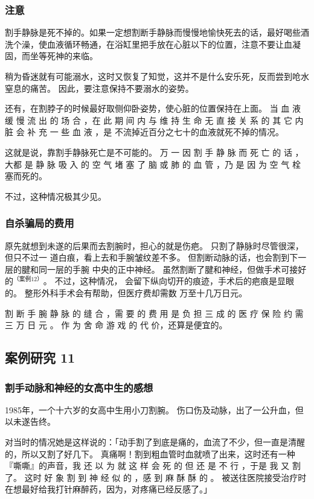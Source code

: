 \documentclass[UTF8]{ctexart}
\begin{document}
\subsubsection*{注意}

割手静脉是死不掉的。如果一定想割断手静脉而慢慢地愉快死去的话，最好喝些酒洗个澡，使血液循环畅通，在浴缸里把手放在心脏以下的位置，注意不要让血凝固，而坐等死神的来临。

稍为昏迷就有可能溺水，这时又恢复了知觉，这并不是什么安乐死，反而尝到呛水窒息的痛苦。
因此，要注意保持不要溺水的姿势。

还有，在割脖子的时候最好取侧仰卧姿势，使心脏的位置保持在上面。
当 血 液 缓 慢 流 出 的 场 合 ，在 此 期 间 内 与 维 持 生 命 无 直 接 关 系 的 其 它 内 脏 会 补 充 一 些 血 液 ，是 不流掉近百分之七十的血液就死不掉的情况。

这就是说，靠割手静脉死亡是不可能的。 
万 一 因 割 手 静 脉 而 死 亡 的 话 ，大都 是 静 脉 吸 入 的 空 气 堵 塞 了 脑 或 肺 的 血 管 ，乃 是 因 为 空 气 栓 塞而死的。

不过，这种情况极其少见。 

\subsubsection*{自杀骗局的费用}

原先就想到未遂的后果而去割腕时，担心的就是伤疤。
只割了静脉时尽管很深，但只不过一 道白痕，看上去和手腕皱纹差不多。
但割断动脉的话，也会割到下一层的腱和同一层的手腕 中央的正中神经。
虽然割断了腱和神经，但做手术可接好的$^{（案例 12）}$。
不过，这种情况， 会留下纵向切开的痕迹，手术后的疤痕是显眼的。
整形外科手术会有帮助，但医疗费却需数 万至十几万日元。

割 断 手 腕 静 脉 的 缝 合 ，需 要 的 费 用 是 负 担 三 成 的 医 疗 保 险 约 需 三 万 日 元 。
作 为 舍 命 游 戏 的 代 价，还算是便宜的。

\subsection{案例研究 11}
\subsubsection*{割手动脉和神经的女高中生的感想}

1985年，一个十六岁的女高中生用小刀割腕。
伤口伤及动脉，出了一公升血，但以未遂告终。

对当时的情况她是这样说的：「动手割了到底是痛的，血流了不少，但一直是清醒的，所以又割了好几下。
真痛啊！割到粗血管时血就喷了出来，这时还有一种『嘶嘶』的声音，我 还 以 为 就 这 样 会 死 的 但 还 是 不 行 ，于是 我 又 割 了。
这时 好 象 割 到 神 经 似 的 ，感 到 麻 酥 酥 的 。 
被送往医院接受治疗时在想最好给我打针麻醉药，因为，对疼痛已经反感了。」
\end{document}
